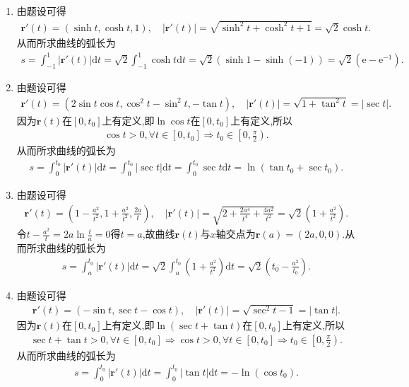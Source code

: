 \documentclass[../../main.tex]{subfiles}%
\begin{document}
\begin{solution}
\begin{enumerate}[(1)]
\item 由题设可得
\begin{align*}
\bm{r}'(t)=(\sinh t,\cosh t,1),\quad |\bm{r}'(t)|=\sqrt{\sinh^2 t+\cosh^2 t+1}=\sqrt{2}\cosh t.
\end{align*}
从而所求曲线的弧长为
\begin{align*}
s=\int_{-1}^1 |\bm{r}'(t)|\mathrm{d}t=\sqrt{2}\int_{-1}^1 \cosh t\mathrm{d}t=\sqrt{2}\left( \sinh 1-\sinh (-1) \right)=\sqrt{2}\left( \mathrm{e}-\mathrm{e}^{-1} \right).
\end{align*}

\item 由题设可得
\begin{align*}
\bm{r}'(t)=(2\sin t\cos t,\cos^2 t-\sin^2 t,-\tan t),\quad |\bm{r}'(t)|=\sqrt{1+\tan^2 t}=|\sec t|.
\end{align*}
因为$\bm{r}(t)$在$[0,t_0]$上有定义,即$\ln\cos t$在$[0,t_0]$上有定义,所以
\begin{align*}
\cos t>0,\forall t\in [0,t_0] \Longrightarrow t_0\in \left[0,\frac{\pi}{2}\right).
\end{align*}
从而所求曲线的弧长为
\begin{align*}
s=\int_0^{t_0} |\bm{r}'(t)|\mathrm{d}t=\int_0^{t_0} |\sec t|\mathrm{d}t=\int_0^{t_0} \sec t\mathrm{d}t=\ln \left( \tan t_0+\sec t_0 \right).
\end{align*}

\item 由题设可得
\begin{align*}
\bm{r}'(t)=\left(1-\frac{a^2}{t^2},1+\frac{a^2}{t^2},\frac{2a}{t}\right),\quad |\bm{r}'(t)|=\sqrt{2+\frac{2a^4}{t^4}+\frac{4a^2}{t^2}}=\sqrt{2}\left(1+\frac{a^2}{t^2}\right).
\end{align*}
令$t-\frac{a^2}{t}=2a\ln \frac{t}{a}=0$得$t=a$,故曲线$\bm{r}(t)$与$x$轴交点为$\bm{r}(a)=(2a,0,0)$.从而所求曲线的弧长为
\begin{align*}
s=\int_a^{t_0} |\bm{r}'(t)|\mathrm{d}t=\sqrt{2}\int_a^{t_0} \left(1+\frac{a^2}{t^2}\right)\mathrm{d}t=\sqrt{2}\left( t_0-\frac{a^2}{t_0} \right).
\end{align*}

\item 由题设可得
\begin{align*}
\bm{r}'(t)=(-\sin t,\sec t-\cos t),\quad |\bm{r}'(t)|=\sqrt{\sec^2 t-1}=|\tan t|.
\end{align*}
因为$\bm{r}(t)$在$[0,t_0]$上有定义,即$\ln(\sec t+\tan t)$在$[0,t_0]$上有定义,所以
\begin{align*}
\sec t+\tan t>0,\forall t\in [0,t_0] \Longrightarrow \cos t>0,\forall t\in [0,t_0] \Longrightarrow t_0\in \left[0,\frac{\pi}{2}\right).
\end{align*}
从而所求曲线的弧长为
\begin{align*}
s=\int_0^{t_0} |\bm{r}'(t)|\mathrm{d}t=\int_0^{t_0} |\tan t|\mathrm{d}t=-\ln \left( \cos t_0 \right).
\end{align*}


\end{enumerate}
\end{solution}
\end{document}
